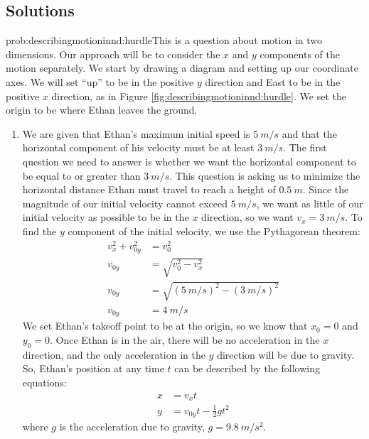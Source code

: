\subsection{Solutions}
\begin{solution}{prob:describingmotioninnd:hurdle}\label{soln:describingmotioninnd:hurdle}This is a question about motion in two dimensions. Our approach will be to consider the $x$ and $y$ components of the motion separately. We start by drawing a diagram and setting up our coordinate axes. We will set ``up'' to be in the positive $y$ direction and East to be in the positive $x$ direction, as in Figure \ref{fig:describingmotioninnd:hurdle}. We set the origin to be where Ethan leaves the ground.


\begin{enumerate}[label=\alph*)]
\item We are given that Ethan's maximum initial speed is $\SI{5}{m/s}$ and that the horizontal component of his velocity must be at least $\SI{3}{m/s}$. The first question we need to answer is whether we want the horizontal component to be equal to or greater than $\SI{3}{m/s}$. This question is asking us to minimize the horizontal distance Ethan must travel to reach a height of $\SI{0.5}{m}$. Since the magnitude of our initial velocity cannot exceed $\SI{5}{m/s}$, we want as little of our initial velocity as possible to be in the $x$ direction, so we want $v_x=\SI{3}{m/s}$. To find the $y$ component of the initial velocity, we use the Pythagorean theorem: 
\begin{align*}
v_x^2+v_{0y}^2&=v_0^2\\
v_{0y}&=\sqrt{v_0^2-v_x^2}\\
v_{0y}&=\sqrt{(\SI{5}{m/s})^2-(\SI{3}{m/s})^2}\\
v_{0y}&=\SI{4}{m/s}
\end{align*}
We set Ethan's takeoff point to be at the origin, so we know that $x_0=0$ and $y_0=0$. Once Ethan is in the air, there will be no acceleration in the $x$ direction, and the only acceleration in the $y$ direction will be due to gravity.
So, Ethan's position at any time $t$ can be described by the following equations: 
\begin{align*}
x&=v_{x}t\\
y&=v_{0y}t-\frac{1}{2}gt^2
\end{align*}
where $g$ is the acceleration due to gravity, $g=\SI{9.8}{m/s^2}$.\\


\end{enumerate}
\end{solution}
